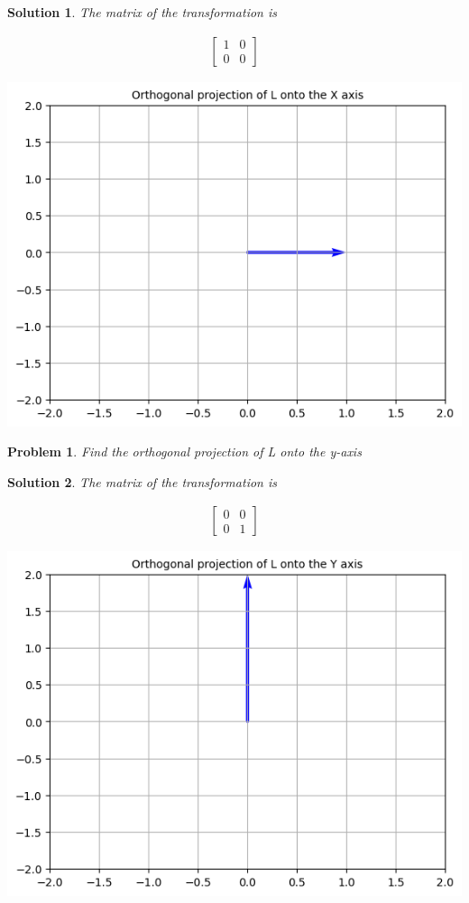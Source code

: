 \documentclass{article}
\newtheorem{problem}{Problem}
\newtheorem*{solution}{Solution}
\begin{document}
\begin{solution}
The matrix of the transformation is 

\begin{align*}
\begin{bmatrix}
1 & 0 \\ 
0 & 0
\end{bmatrix}
\end{align*}

\includegraphics[scale=0.5, center]{Lorthogonalprojx} 

\end{solution}

\begin{problem}
Find the orthogonal projection of L onto the y-axis
\end{problem}

\begin{solution}
The matrix of the transformation is 

\begin{align*}
\begin{bmatrix}
0 & 0 \\ 
0 & 1
\end{bmatrix}
\end{align*}

\includegraphics[scale=0.5, center]{Lorthogonalprojy} 

\end{solution}
\end{document}
